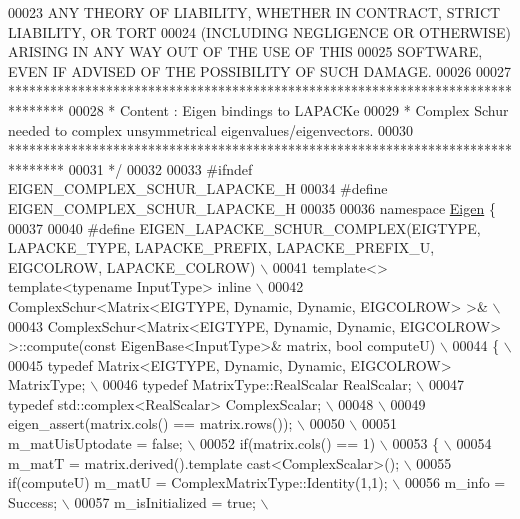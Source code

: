 \begin{DoxyCode}
00023 \textcolor{comment}{ ANY THEORY OF LIABILITY, WHETHER IN CONTRACT, STRICT LIABILITY, OR TORT}
00024 \textcolor{comment}{ (INCLUDING NEGLIGENCE OR OTHERWISE) ARISING IN ANY WAY OUT OF THE USE OF THIS}
00025 \textcolor{comment}{ SOFTWARE, EVEN IF ADVISED OF THE POSSIBILITY OF SUCH DAMAGE.}
00026 \textcolor{comment}{}
00027 \textcolor{comment}{ ********************************************************************************}
00028 \textcolor{comment}{ *   Content : Eigen bindings to LAPACKe}
00029 \textcolor{comment}{ *    Complex Schur needed to complex unsymmetrical eigenvalues/eigenvectors.}
00030 \textcolor{comment}{ ********************************************************************************}
00031 \textcolor{comment}{*/}
00032 
00033 \textcolor{preprocessor}{#ifndef EIGEN\_COMPLEX\_SCHUR\_LAPACKE\_H}
00034 \textcolor{preprocessor}{#define EIGEN\_COMPLEX\_SCHUR\_LAPACKE\_H}
00035 
00036 \textcolor{keyword}{namespace }\hyperlink{namespace_eigen}{Eigen} \{ 
00037 
00040 \textcolor{preprocessor}{#define EIGEN\_LAPACKE\_SCHUR\_COMPLEX(EIGTYPE, LAPACKE\_TYPE, LAPACKE\_PREFIX, LAPACKE\_PREFIX\_U, EIGCOLROW,
       LAPACKE\_COLROW) \(\backslash\)}
00041 \textcolor{preprocessor}{template<> template<typename InputType> inline \(\backslash\)}
00042 \textcolor{preprocessor}{ComplexSchur<Matrix<EIGTYPE, Dynamic, Dynamic, EIGCOLROW> >& \(\backslash\)}
00043 \textcolor{preprocessor}{ComplexSchur<Matrix<EIGTYPE, Dynamic, Dynamic, EIGCOLROW> >::compute(const EigenBase<InputType>& matrix,
       bool computeU) \(\backslash\)}
00044 \textcolor{preprocessor}{\{ \(\backslash\)}
00045 \textcolor{preprocessor}{  typedef Matrix<EIGTYPE, Dynamic, Dynamic, EIGCOLROW> MatrixType; \(\backslash\)}
00046 \textcolor{preprocessor}{  typedef MatrixType::RealScalar RealScalar; \(\backslash\)}
00047 \textcolor{preprocessor}{  typedef std::complex<RealScalar> ComplexScalar; \(\backslash\)}
00048 \textcolor{preprocessor}{\(\backslash\)}
00049 \textcolor{preprocessor}{  eigen\_assert(matrix.cols() == matrix.rows()); \(\backslash\)}
00050 \textcolor{preprocessor}{\(\backslash\)}
00051 \textcolor{preprocessor}{  m\_matUisUptodate = false; \(\backslash\)}
00052 \textcolor{preprocessor}{  if(matrix.cols() == 1) \(\backslash\)}
00053 \textcolor{preprocessor}{  \{ \(\backslash\)}
00054 \textcolor{preprocessor}{    m\_matT = matrix.derived().template cast<ComplexScalar>(); \(\backslash\)}
00055 \textcolor{preprocessor}{    if(computeU)  m\_matU = ComplexMatrixType::Identity(1,1); \(\backslash\)}
00056 \textcolor{preprocessor}{      m\_info = Success; \(\backslash\)}
00057 \textcolor{preprocessor}{      m\_isInitialized = true; \(\backslash\)}

\end{DoxyCode}

